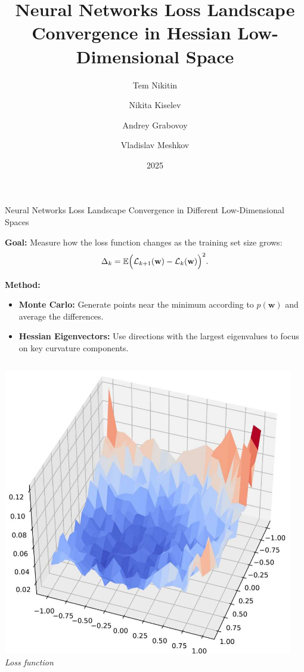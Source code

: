 \documentclass[10pt]{beamer}
\title[Loss Landscape Convergence]{Neural Networks Loss Landscape Convergence in Hessian Low-Dimensional Space}
\author[Tem Nikitin \textit{et al.}]{Tem Nikitin \and Nikita Kiselev \and Andrey Grabovoy \and Vladislav Meshkov}
\institute{Moscow Institute of Physics and Technology}
\date{2025}
\begin{document}
\begin{frame}{Neural Networks Loss Landscape Convergence in Different Low-Dimensional Spaces}

    \textbf{Goal:} Measure how the loss function changes as the training set size grows:
    $$
        \Delta_k =
        \mathbb{E} \Bigl( \mathcal{L}_{k+1} (\mathbf{w}) - \mathcal{L}_{k} (\mathbf{w}) \Bigr)^2.
    $$

    \textbf{Method:}
    \begin{itemize}
        \item \textbf{Monte Carlo:} Generate points near the minimum according to $p(\mathbf{w})$ and average the differences.
        \item \textbf{Hessian Eigenvectors:} Use directions with the largest eigenvalues to focus on key curvature components.
    \end{itemize}

    \begin{columns}[t]
        \centering
        \hspace*{-2cm}
        \includegraphics[width=0.95\textwidth]{img/LS_16.pdf}\\
        \hspace*{-2cm}
        \scriptsize \textit{Loss function}


\end{columns}
\end{frame}
\end{document}
